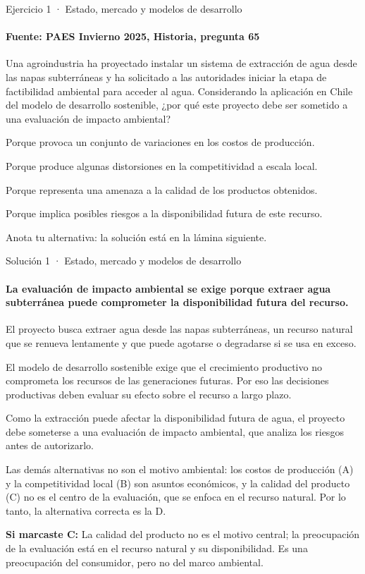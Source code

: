 \documentclass[aspectratio=169,11pt]{beamer}
\newcommand{\alternativa}[2]{\begin{opcion}\tecla{#1}\hspace{0.6em}#2\end{opcion}}
\newcommand{\paso}[2]{\par\noindent\makebox[1.4em][l]{\color{zinc500}\ttfamily\small #1}\parbox[t]{\dimexpr\linewidth-1.4em}{#2}\par\vspace{0.45em}}
\newcommand{\respuesta}[2]{\par\vspace{0.3em}\noindent\teclaok{#1}\hspace{0.5em}{\small\bfseries respuesta oficial}\hspace{0.5em}{\scriptsize\color{zinc500}#2}\par}
\newlength{\ajustealto}
\newenvironment{ajustar}[1][0.74\textheight]
  {\setlength{\ajustealto}{#1}\begin{lrbox}{\ajustecaja}\begin{minipage}{\textwidth}}
  {\end{minipage}\end{lrbox}%
   \ifdim\dimexpr\ht\ajustecaja+\dp\ajustecaja\relax>\ajustealto
     \resizebox*{!}{\ajustealto}{\usebox{\ajustecaja}}\else\usebox{\ajustecaja}\fi}
\begin{document}
\begin{frame}{Ejercicio 1 · Estado, mercado y modelos de desarrollo}
\framesubtitle{Fuente: PAES Invierno 2025, Historia, pregunta 65}
\begin{ajustar}[0.7\textheight]
{\small Una agroindustria ha proyectado instalar un sistema de extracción de agua desde las napas subterráneas y ha solicitado a las autoridades iniciar la etapa de factibilidad ambiental para acceder al agua. Considerando la aplicación en Chile del modelo de desarrollo sostenible, ¿por qué este proyecto debe ser sometido a una evaluación de impacto ambiental?}
\vspace{0.4em}
\alternativa{A}{Porque provoca un conjunto de variaciones en los costos de producción.}
\alternativa{B}{Porque produce algunas distorsiones en la competitividad a escala local.}
\alternativa{C}{Porque representa una amenaza a la calidad de los productos obtenidos.}
\alternativa{D}{Porque implica posibles riesgos a la disponibilidad futura de este recurso.}
\end{ajustar}
\vfill{\tiny\color{zinc500}\hfill Anota tu alternativa: la solución está en la lámina siguiente.}
\end{frame}

\begin{frame}{Solución 1 · Estado, mercado y modelos de desarrollo}
\framesubtitle{La evaluación de impacto ambiental se exige porque extraer agua subterránea puede comprometer la disponibilidad futura del recurso.}
\begin{ajustar}[0.64\textheight]
{\footnotesize
\paso{1}{El proyecto busca extraer agua desde las napas subterráneas, un recurso natural que se renueva lentamente y que puede agotarse o degradarse si se usa en exceso.}
\paso{2}{El modelo de desarrollo sostenible exige que el crecimiento productivo no comprometa los recursos de las generaciones futuras. Por eso las decisiones productivas deben evaluar su efecto sobre el recurso a largo plazo.}
\paso{3}{Como la extracción puede afectar la disponibilidad futura de agua, el proyecto debe someterse a una evaluación de impacto ambiental, que analiza los riesgos antes de autorizarlo.}
\paso{4}{Las demás alternativas no son el motivo ambiental: los costos de producción (A) y la competitividad local (B) son asuntos económicos, y la calidad del producto (C) no es el centro de la evaluación, que se enfoca en el recurso natural. Por lo tanto, la alternativa correcta es la D.}
}
\respuesta{D}{PAES Invierno 2025, Historia, pregunta 65}
\begin{notagris}\scriptsize \textbf{Si marcaste C:} La calidad del producto no es el motivo central; la preocupación de la evaluación está en el recurso natural y su disponibilidad. Es una preocupación del consumidor, pero no del marco ambiental.\end{notagris}
\end{ajustar}
\end{frame}
\end{document}
